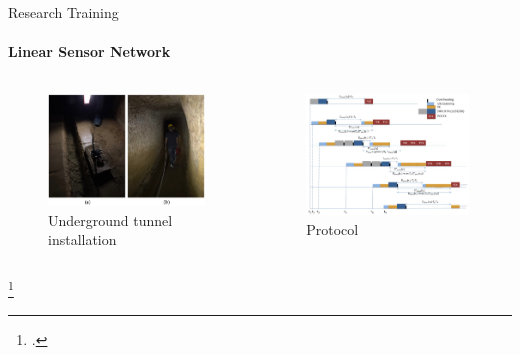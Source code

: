 \begin{frame}{Research Training}
\framesubtitle{Linear Sensor Network}
\begin{columns}
\begin{column}{0.5\textwidth}
\begin{figure}[H]
    \centering
    \includegraphics[width=1\textwidth]{presentation.tex/fig/lsnlora.jpg}
    \caption{Underground tunnel installation\footnotemark}
\end{figure}
\end{column}
\begin{column}{0.5\textwidth}
\begin{figure}[H]
    \centering
    \includegraphics[width=0.98\textwidth]{presentation.tex/fig/lsnlora2.jpg}
    \caption{Protocol\footnotemark}
\end{figure}
\end{column}
\end{columns}
\footcitetext{Abrardo_2019}
\end{frame}

